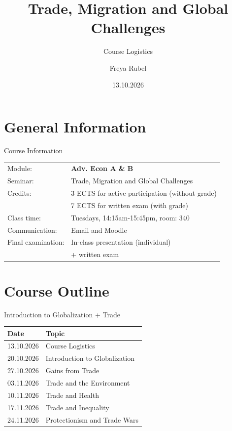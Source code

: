 \documentclass{beamer}
\author{Freya Rubel}
\title{Trade, Migration and Global Challenges}
\subtitle{Course Logistics}
\institute{}
\date{13.10.2026}
\begin{document}
\begin{frame}
    \titlepage
\end{frame}

\begin{frame}
    \tableofcontents[sectionstyle=show, subsectionstyle=show/shaded/hide, subsubsectionstyle=show/shaded/hide]
\end{frame}

\section{General Information}

\begin{frame}{Course Information}
\begin{tabular}{ll}
    Module: & \textbf{Adv. Econ A \& B} \\
   Seminar:  & Trade, Migration and Global Challenges \\
   Credits:  & 3 ECTS for active participation (without grade) \\
   & 7 ECTS for written exam (with grade) \\
   Class time: & Tuesdays, 14:15am-15:45pm, room: 340 \\
   Communication: & Email and Moodle \\
   Final examination: & In-class presentation (individual) \\
   & + written exam 
\end{tabular}
\end{frame}

\section{Course Outline}

\begin{frame}{Introduction to Globalization + Trade} 
  \begin{tabular}{ll}
       \textbf{Date} & \textbf{Topic} \\
       \hline
       13.10.2026 & Course Logistics \\
       20.10.2026 & Introduction to Globalization \\
       27.10.2026 & Gains from Trade \\
       03.11.2026 & Trade and the Environment \\
       10.11.2026 & Trade and Health \\
       17.11.2026 & Trade and Inequality \\
       24.11.2026 & Protectionism and Trade Wars
  \end{tabular}
\end{frame}
\end{document}
